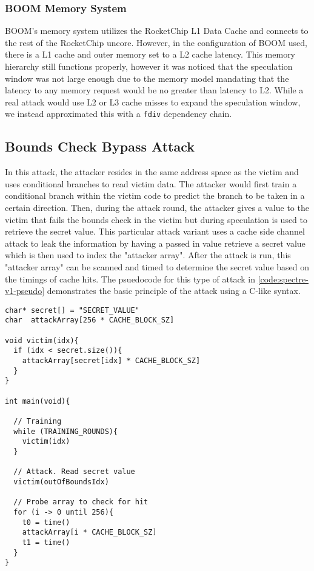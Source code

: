 \subsubsection{BOOM Memory System}


BOOM's memory system utilizes the RocketChip L1 Data Cache and connects to the rest of the RocketChip
uncore. However, in the configuration of BOOM used, there is a L1 cache and outer memory set to a L2 cache
latency. This memory hierarchy still functions properly, however it was noticed that the speculation window
was not large enough due to the memory model mandating that the latency to any memory request would be no greater than latency to L2.
While a real attack would use L2 or L3 cache misses to expand the speculation window, we instead approximated this with a {\tt fdiv} dependency chain.

\subsection{Bounds Check Bypass Attack}

In this attack, the attacker resides in the same address space as the victim and uses
conditional branches to read victim data. The attacker would first train a conditional branch
within the victim code to predict the branch to be taken in a certain direction. Then,
during the attack round, the attacker
gives a value to the victim that fails the bounds check in the victim but during
speculation is used to retrieve the secret value. This particular attack variant
uses a cache side channel attack to leak the information by having a passed in value retrieve
a secret value which is then used to index the "attacker array". After the attack is run, this 
"attacker array" can be scanned and timed to determine the secret value based on the timings
of cache hits. The psuedocode for this type of attack in \ref{code:spectre-v1-pseudo}
demonstrates the basic principle of the attack using a C-like syntax.

\begin{lstlisting}[style=column-code, caption=Psuedocode of Bounds Check Bypass Attack]
char* secret[] = "SECRET_VALUE"
char  attackArray[256 * CACHE_BLOCK_SZ]

void victim(idx){
  if (idx < secret.size()){
    attackArray[secret[idx] * CACHE_BLOCK_SZ]
  }
}

int main(void){
  
  // Training
  while (TRAINING_ROUNDS){
    victim(idx)
  }

  // Attack. Read secret value
  victim(outOfBoundsIdx)

  // Probe array to check for hit
  for (i -> 0 until 256){
    t0 = time()
    attackArray[i * CACHE_BLOCK_SZ]
    t1 = time()
  }
}
\end{lstlisting}\label{code:spectre-v1-pseudo}

